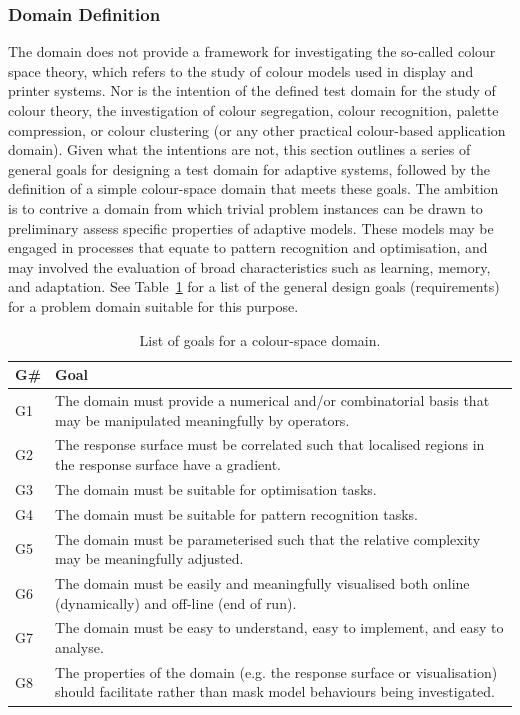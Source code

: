 \subsubsection{Domain Definition}
The domain does not provide a framework for investigating the so-called colour space theory, which refers to the study of colour models used in display and printer systems. Nor is the intention of the defined test domain for the study of colour theory, the investigation of colour segregation, colour recognition, palette compression, or colour clustering (or any other practical colour-based application domain). Given what the intentions are not, this section outlines a series of general goals for designing a test domain for adaptive systems, followed by the definition of a simple colour-space domain that meets these goals. The ambition is to contrive a domain from which trivial problem instances can be drawn to preliminary assess specific properties of adaptive models. These models may be engaged in processes that equate to pattern recognition and optimisation, and may involved the evaluation of broad characteristics such as learning, memory, and adaptation. See Table~\ref{tab:cells:colourspace:goals} for a list of the general design goals (requirements) for a problem domain suitable for this purpose.

\begin{table}[ht]
	\centering\small
		\begin{tabularx}{\textwidth}{lX}
		\toprule
		\textbf{G\#} & \textbf{Goal} \\ 
		\toprule
		G1 & The domain must provide a numerical and/or combinatorial basis that may be manipulated meaningfully by operators. \\ 
		\midrule
		G2 & The response surface must be correlated such that localised regions in the response surface have a gradient. \\ 
		\midrule
		G3 & The domain must be suitable for optimisation tasks.  \\ 
		\midrule
		G4 & The domain must be suitable for pattern recognition tasks. \\ 
		\midrule
		G5 & The domain must be parameterised such that the relative complexity may be meaningfully adjusted. \\ 
		\midrule
		G6 & The domain must be easily and meaningfully visualised both online (dynamically) and off-line (end of run). \\ 
		\midrule
		G7 & The domain must be easy to understand, easy to implement, and easy to analyse. \\ 
		\midrule
		G8 & The properties of the domain (e.g. the response surface or visualisation) should facilitate rather than mask model behaviours being investigated. \\ 
		\bottomrule
		\end{tabularx}	
	\caption{List of goals for a colour-space domain.}
	\label{tab:cells:colourspace:goals}
\end{table}

